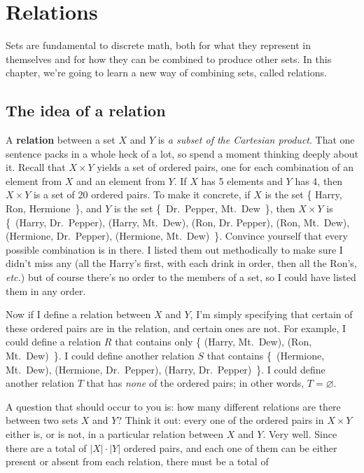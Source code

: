
\chapter{Relations}
\label{chap:relations}

Sets are fundamental to discrete math, both for what they represent in
themselves and for how they can be combined to produce other sets. In this
chapter, we're going to learn a new way of combining sets, called
relations.

\section{The idea of a relation}

A \textbf{relation} between a set $X$ and $Y$ is \textit{a subset of the
Cartesian product}. That one sentence packs in a whole heck of a lot, so
spend a moment thinking deeply about it. Recall that $X \times Y$ yields a
set of ordered pairs, one for each combination of an element from $X$ and
an element from $Y$. If $X$ has 5 elements and $Y$ has 4, then $X \times Y$
is a set of 20 ordered pairs. To make it concrete, if $X$ is the set \{
Harry, Ron, Hermione~\}, and $Y$ is the set \{~Dr.~Pepper, Mt.~Dew~\}, then
$X \times Y$ is \{~(Harry, Dr.~Pepper), (Harry, Mt.~Dew), (Ron, Dr.
Pepper), (Ron, Mt.~Dew), (Hermione, Dr.~Pepper), (Hermione, Mt.~Dew)~\}.
Convince yourself that every possible combination is in there. I listed
them out methodically to make sure I didn't miss any (all the Harry's
first, with each drink in order, then all the Ron's, \textit{etc.}) but of
course there's no order to the members of a set, so I could have listed
them in any order.

Now if I define a relation between $X$ and $Y$, I'm simply specifying that
certain of these ordered pairs are in the relation, and certain ones are
not. For example, I could define a relation $R$ that contains only \{
(Harry, Mt.~Dew), (Ron, Mt.~Dew)~\}. I could define another relation $S$
that contains \{~(Hermione, Mt.~Dew), (Hermione, Dr.~Pepper), (Harry,
Dr.~Pepper)~\}. I could define another relation $T$ that has \textit{none}
of the ordered pairs; in other words, $T = \varnothing$. 

A question that should occur to you is: how many different relations are
there between two sets $X$ and $Y$? Think it out: every one of the ordered
pairs in $X \times Y$ either is, or is not, in a particular relation
between $X$ and $Y$. Very well. Since there are a total of $|X|\cdot|Y|$
ordered pairs, and each one of them can be either present or absent from
each relation, there must be a total of

